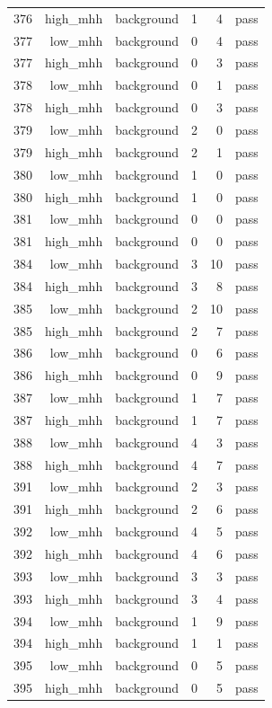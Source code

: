 \begin{table}[htbp]
{\begin{tabular}{lrrrrr}
376 & high\_mhh & background & 1 & 4 & pass \\
377 & low\_mhh & background & 0 & 4 & pass \\
377 & high\_mhh & background & 0 & 3 & pass \\
378 & low\_mhh & background & 0 & 1 & pass \\
378 & high\_mhh & background & 0 & 3 & pass \\
379 & low\_mhh & background & 2 & 0 & pass \\
379 & high\_mhh & background & 2 & 1 & pass \\
380 & low\_mhh & background & 1 & 0 & pass \\
380 & high\_mhh & background & 1 & 0 & pass \\
381 & low\_mhh & background & 0 & 0 & pass \\
381 & high\_mhh & background & 0 & 0 & pass \\
384 & low\_mhh & background & 3 & 10 & pass \\
384 & high\_mhh & background & 3 & 8 & pass \\
385 & low\_mhh & background & 2 & 10 & pass \\
385 & high\_mhh & background & 2 & 7 & pass \\
386 & low\_mhh & background & 0 & 6 & pass \\
386 & high\_mhh & background & 0 & 9 & pass \\
387 & low\_mhh & background & 1 & 7 & pass \\
387 & high\_mhh & background & 1 & 7 & pass \\
388 & low\_mhh & background & 4 & 3 & pass \\
388 & high\_mhh & background & 4 & 7 & pass \\
391 & low\_mhh & background & 2 & 3 & pass \\
391 & high\_mhh & background & 2 & 6 & pass \\
392 & low\_mhh & background & 4 & 5 & pass \\
392 & high\_mhh & background & 4 & 6 & pass \\
393 & low\_mhh & background & 3 & 3 & pass \\
393 & high\_mhh & background & 3 & 4 & pass \\
394 & low\_mhh & background & 1 & 9 & pass \\
394 & high\_mhh & background & 1 & 1 & pass \\
395 & low\_mhh & background & 0 & 5 & pass \\
395 & high\_mhh & background & 0 & 5 & pass \\

\end{tabular}}
\end{table}
